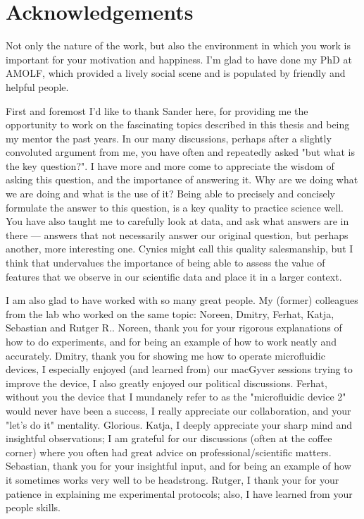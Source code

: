 



\chapter*{Acknowledgements}

Not only the nature of the work, but also the environment in which you work is important for your motivation and happiness.
%
I'm glad to have done my PhD at AMOLF, which provided 
a lively social scene and
is populated by friendly and helpful people.



First and foremost I'd like to thank Sander here, 
for providing me the opportunity to work on the fascinating topics described in this thesis and being my mentor the past years.
%
In our many discussions,
perhaps after a slightly convoluted argument from me,  
you have often and repeatedly asked "but what is the key question?".
%
I have more and more come to appreciate the wisdom of asking this question, 
and the importance of answering it.
Why are we doing what we are doing and what is the use of it?
Being able to precisely and concisely formulate the answer to this question, 
is a key quality to practice science well. 
%
You have also taught me to carefully look at data,
and ask what answers are in there --- 
answers that not necessarily answer our original question,
but perhaps another, more interesting one. 
%
Cynics might call this quality salesmanship,
but I think that undervalues the importance
of being able to assess the value of features that we observe in our scientific data and place it in a larger context.


I am also glad to have worked with so many great people.
%
My (former) colleagues from the lab who worked on the same topic: 
Noreen, Dmitry, Ferhat, Katja, Sebastian and Rutger R..
%
Noreen, thank you for your rigorous explanations of how to do experiments,
and for being an example of how to work neatly and accurately.
%
Dmitry, thank you for showing me how to operate microfluidic devices,
I especially enjoyed (and learned from) our macGyver sessions trying to improve the device, 
I also greatly enjoyed our political discussions.
%
Ferhat, without you the device that I mundanely refer to as the "microfluidic device 2" would never have been a success,
I really appreciate our collaboration, and your "let's do it" mentality. Glorious.
%
Katja, I deeply appreciate your sharp mind and insightful observations; I am grateful for 
our discussions (often at the coffee corner) where you often had great advice on professional/scientific matters. 
%
Sebastian, thank you for your insightful input,
and for being an example of how it sometimes works very well to be headstrong. 
%
Rutger, I thank your for your patience in explaining me experimental protocols; 
also, I have learned from your people skills.


